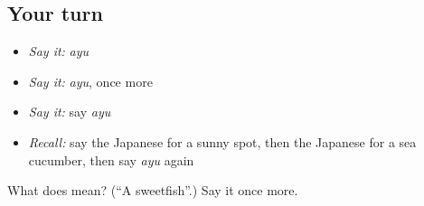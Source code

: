 \subsection*{Your turn}
\begin{itemize}
\raggedright
  \item \emph{Say it:} \emph{ayu}
  \item \emph{Say it:} \emph{ayu}, once more
  \item \emph{Say it:} say \emph{ayu}
  \item \emph{Recall:} say the Japanese for a sunny spot, then the Japanese for a sea cucumber, then say \emph{ayu} again
\end{itemize}

\begin{tcolorbox}[breakable,colback=teal!4,colframe=teal!35!black,title={Before you move on}]
What does  mean? (\textquotedblleft{}A sweetfish\textquotedblright{}.) Say it once more.
\end{tcolorbox}
